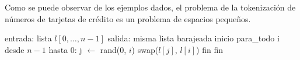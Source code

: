 Como se puede observar de los ejemplos dados, el problema de la tokenización
de números de tarjetas de crédito es un problema de espacios pequeños.

\begin{pseudocodigo}[%
  caption={\textit{Knuth shuffle}, \cite{DBLP:books/aw/Knuth69}.},
  label={knuth_shuffle}%
]
    entrada: lista $ l[0, \dots, n - 1] $
    salida:  misma lista barajeada
    inicio
      para_todo i desde $ n - 1 $ hasta 0:
        j $ \gets $ rand($ 0 $, $ i $)
        swap($ l[j] $, $ l[i] $)
      fin
    fin
\end{pseudocodigo}

